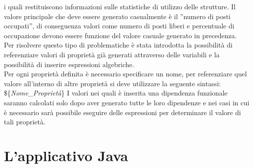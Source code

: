 \documentclass[12pt,a4paper,italian]{article}
\begin{document}

i quali restituiscono informazioni sulle statistiche di utilizzo delle strutture. Il valore principale che deve essere 
generato casualmente è il  ''numero di posti occupati'', di conseguenza valori come numero di posti liberi e percentuale di occupazione devono essere funzione del valore
casuale generato in precedenza.\\
Per risolvere questo tipo di problematiche è stata introdotta la possibilità di referenziare valori di proprietà già generati attraverso delle variabili e la possibilità di 
inserire espressioni algebriche.\\
Per ogni proprietà definita è necessario specificare un nome, per referenziare quel valore all'interno di altre proprietà si deve utilizzare la seguente sintassi: \$\{\emph{Nome\_Proprietà}\}
I valori nei quali è inserita una dipendenza funzionale saranno calcolati solo dopo aver generato tutte le loro dipendenze e nei casi in cui è necessario sarà possibile eseguire delle espressioni 
per determinare il valore di tali proprietà.
\newpage
\section{L'applicativo Java}
\end{document}
